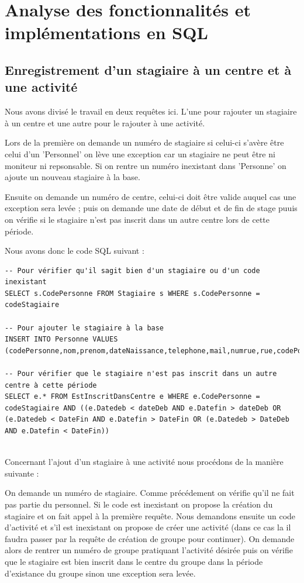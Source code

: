 \documentclass[10pt]{article}
\begin{document}
\section{Analyse des fonctionnalités et implémentations en SQL}

\subsection{Enregistrement d'un stagiaire à un centre et à une activité}

Nous avons divisé le travail en deux requêtes ici. L'une pour rajouter un stagiaire à un centre et une autre pour le rajouter à une activité.

Lors de la première on demande un numéro de stagiaire si celui-ci s'avère être celui d'un 'Personnel' on lève une exception car un stagiaire ne peut être ni moniteur ni repsonsable. Si on rentre un numéro inexistant dans 'Personne' on ajoute un nouveau stagiaire à la base.

Ensuite on demande un numéro de centre, celui-ci doit être valide auquel cas une exception sera levée ; puis on demande une date de début et de fin de stage puuis on vérifie si le stagiaire n'est pas inscrit dans un autre centre lors de cette période.

Nous avons donc le code SQL suivant :

 \begin{small}
\begin{verbatim}
-- Pour vérifier qu'il sagit bien d'un stagiaire ou d'un code inexistant
SELECT s.CodePersonne FROM Stagiaire s WHERE s.CodePersonne = codeStagiaire

-- Pour ajouter le stagiaire à la base
INSERT INTO Personne VALUES (codePersonne,nom,prenom,dateNaissance,telephone,mail,numrue,rue,codePostal,ville)

-- Pour vérifier que le stagiaire n'est pas inscrit dans un autre centre à cette période
SELECT e.* FROM EstInscritDansCentre e WHERE e.CodePersonne = codeStagiaire AND ((e.Datedeb < dateDeb AND e.Datefin > dateDeb OR (e.Datedeb < DateFin AND e.Datefin > DateFin OR (e.Datedeb > DateDeb AND e.Datefin < DateFin))
 
\end{verbatim}
\end{small}

Concernant l'ajout d'un stagiaire à une activité nous procédons de la manière suivante :

On demande un numéro de stagiaire. Comme précédement on vérifie qu'il ne fait pas partie du personnel. Si le code est inexistant on propose la création du stagiaire et on fait appel à la première requête. Nous demandons ensuite un code d'activité et s'il est inexistant on propose de créer une activité (dans ce cas la il faudra passer par la requête de création de groupe pour continuer). 
On demande alors de rentrer un numéro de groupe pratiquant l'activité désirée puis on vérifie que le stagiaire est bien inscrit dans le centre du groupe dans la période d'existance du groupe sinon une exception sera levée.
\end{document}
